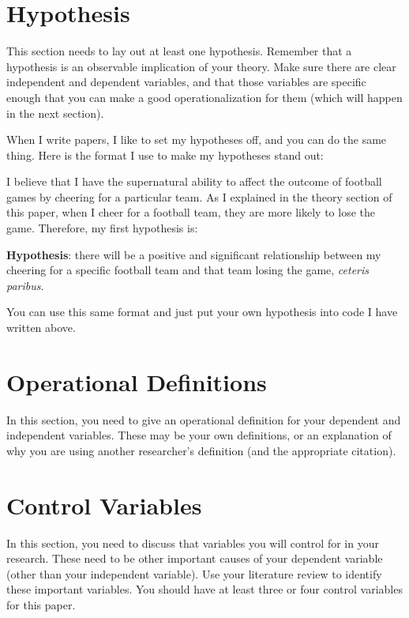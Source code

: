 \documentclass{turabian-researchpaper}
\begin{document}
\section{Hypothesis}
This section needs to lay out at least one hypothesis. Remember that a hypothesis is an observable implication of your theory. Make sure there are clear independent and dependent variables, and that those variables are specific enough that you can make a good operationalization for them (which will happen in the next section).

When I write papers, I like to set my hypotheses off, and you can do the same thing. Here is the format I use to make my hypotheses stand out:

I believe that I have the supernatural ability to affect the outcome of football games by cheering for a particular team. As I explained in the theory section of this paper, when I cheer for a football team, they are more likely to lose the game. Therefore, my first hypothesis is:

\begin{description}
		\item \textbf{Hypothesis}: there will be a positive and significant relationship between my cheering for a specific football team and that team losing the game, \emph{ceteris paribus}.
	\end{description} 

You can use this same format and just put your own hypothesis into code I have written above.

\section{Operational Definitions}
In this section, you need to give an operational definition for your dependent and independent variables. These may be your own definitions, or an explanation of why you are using another researcher's definition (and the appropriate citation). 

\section{Control Variables}
In this section, you need to discuss that variables you will control for in your research. These need to be other important causes of your dependent variable (other than your independent variable). Use your literature review to identify these important variables. You should have at least three or four control variables for this paper.
\end{document}
